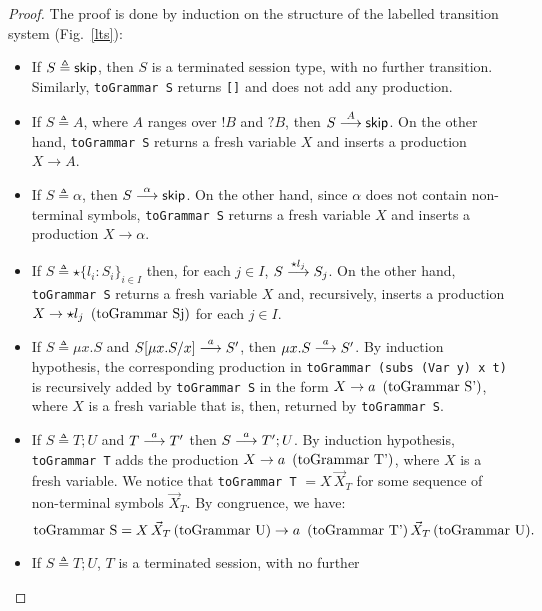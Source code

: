 \begin{proof}
The proof is done by induction on the structure of the labelled
transition system (Fig.~\ref{lts}):
\begin{itemize}
	\item If $S\triangleq \skipk$, then $S$ is a terminated
	      session type, with no further transition. Similarly,
	      \lstinline{toGrammar S} returns \lstinline{[]} and
	      does not add any production.
	\item If $S\triangleq A$, where $A$ ranges over $!B$ and $?B$,
	      then $S  \LTSderives[A] \skipk$. On the other hand,
	      \lstinline{toGrammar S} returns a fresh variable $X$ and
	      inserts a production $X\rightarrow A$.
	\item If $S \triangleq \alpha$, then $S   \LTSderives[\alpha] \skipk$.
	      On the other hand, since $\alpha$ does not contain non-terminal
	      symbols, \lstinline{toGrammar S} returns a fresh variable $X$ and
	      inserts a production $X\rightarrow \alpha$.
	\item If $S\triangleq \star\{l_i\colon S_i\}_{i\in I}$ then, for each
          $j\in I$, $S \LTSderives[\star l_j] S_j$. On the other hand,
          \lstinline{toGrammar S} returns a fresh variable
          $X$ and, recursively, inserts a production
          $X\rightarrow \star l_j \enspace \text{(\lstinline{toGrammar Sj})}$
          for each $j\in I$.
	\item If $S\triangleq \mu x.S$ and $S[\mu x.S/x] \LTSderives[a] S'$,
	      then $\mu x.S \LTSderives[a] S'$. By induction hypothesis,
	      the corresponding production in \lstinline{toGrammar (subs (Var y) x t)}
	      is recursively added by \lstinline{toGrammar S} in the form
	      $X \rightarrow a\enspace  \text{(\lstinline{toGrammar S'})}$,
	      where $X$ is a fresh variable that is, then, returned by
	      \lstinline{toGrammar S}.
	\item If $S\triangleq T;U$ and $T \LTSderives[a] T'$ then $S \LTSderives[a] T';U$.
	      By induction hypothesis, \lstinline{toGrammar T} adds the production
	      $X\rightarrow a \enspace \text{(\lstinline{toGrammar T'})}$, where
	      $X$ is a fresh variable.
		  We notice that \lstinline{toGrammar T} $= X \, \vec X_T$ for some
		  sequence of non-terminal symbols $\vec X_T$. By congruence, we have:
		  \[\text{\lstinline{toGrammar S}} = X \, \vec X_T \, \text{(\lstinline{toGrammar U})}
		  \rightarrow a \enspace \text{(\lstinline{toGrammar T'})} \, \vec X_T  \,
		  \text{(\lstinline{toGrammar U})} .\]
	\item If $S\triangleq T;U$, $T$ is a terminated session, with no further

\end{itemize}
\end{proof}
